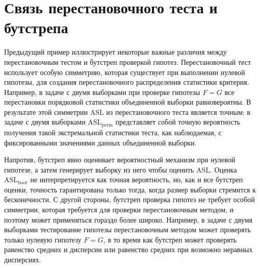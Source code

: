 \section{Связь перестановочного теста и бутстрепа}

Предыдущий пример иллюстрирует некоторые важные различия между перестановочным тестом и бутстреп проверкой гипотез. Перестановочный тест использует особую симметрию, которая существует при выполнении нулевой гипотезы, для создания перестановочного распределения статистики критерия. Например, в задаче с двумя выборками при проверке гипотезы $F = G$ все перестановки порядковой статистики объединенной выборки равновероятны. В результате этой симметрии $\text{ASL}$ из перестановочного теста является точным: в задаче с двумя выборками $\text{ASL}_{\text{perm}}$ представляет собой точную вероятность получения такой экстремальной статистики теста, как наблюдаемая, с фиксированными значениями данных объединенной выборки.

Напротив, бутстреп явно оценивает вероятностный механизм при нулевой гипотезе, а затем генерирует выборку из него чтобы оценить $\text{ASL}$. Оценка $\text{ASL}_{\text{boot}}$ не интерпретируется как точная вероятность, но, как и все бутстреп оценки, точность гарантирована только тогда, когда размер выборки стремится к бесконечности. С другой стороны, бутстреп проверка гипотез не требует особой симметрии, которая требуется для проверки перестановочным методом, и поэтому может применяться гораздо более широко. Например, в задаче с двумя выборками тестирование гипотезы перестановочным методом может проверять только нулевую гипотезу $F = G$, в то время как бутстреп может проверять равенство средних и дисперсии или равенство средних при возможно неравных дисперсиях. 
